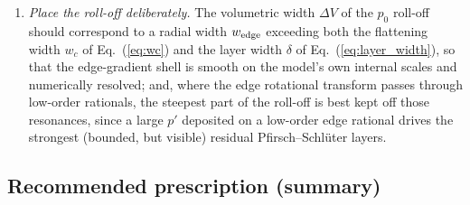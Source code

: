 \documentclass[english]{article}
\newcommand{\bB}{\mathbf{B}}
\begin{document}
\begin{enumerate}
(Sec.~\ref{sec:current}), and the exterior rational surfaces are precisely where an unregularized
$\bB\cdot\nabla$ operator is degenerate. A small uniform floor costs nothing (the layers it
regularizes are undriven) and preserves well-posedness of every iterate. A smooth downward taper
of $D_u$ across the edge, toward a smaller exterior floor, is admissible and sharpens the decay
(\ref{eq:u_leakage}) if one wishes the exterior to be more strictly current-free; as everywhere in
this model, the converged answer should be shown insensitive to the choice by a scan
(Sec.~\ref{sec:numerics}).
\item \emph{Place the roll-off deliberately.} The volumetric width $\Delta V$ of the
$p_0$ roll-off should correspond to a radial width $w_{\rm edge}$ exceeding both the flattening
width $w_c$ of Eq.~(\ref{eq:wc}) and the layer width $\delta$ of Eq.~(\ref{eq:layer_width}), so
that the edge-gradient shell is smooth on the model's own internal scales and numerically
resolved; and, where the edge rotational transform passes through low-order rationals, the
steepest part of the roll-off is best kept off those resonances, since a large $p'$ deposited on a
low-order edge rational drives the strongest (bounded, but visible) residual
Pfirsch--Schl\"uter layers.
\end{enumerate}

\subsection{Recommended prescription (summary)}
\label{sec:edge_recipe}
\end{document}
